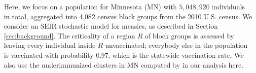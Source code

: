 Here, we focus on a population for Minnesota (MN) with $5,048,920$ individuals in total, aggregated into 4,082 census block groups from the 2010 U.S. census. 
We consider an SEIR  stochastic model for measles, as described in
Section \ref{sec:background}.
The criticality of a region $R$ of block groups is assessed by leaving 
every individual inside $R$ unvaccinated; everybody else in the population 
is vaccinated with probability 0.97, which is the statewide vaccination rate. 
We also use the underimmunized clusters in MN computed by \cite{cadena:vacc-cluster}
in our analysis here.



